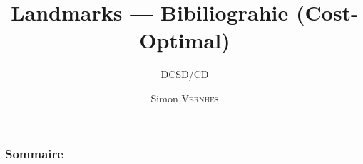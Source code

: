 \documentclass{beamer}
\title{Landmarks — Bibiliograhie (Cost-Optimal)}
\subtitle{\footnotesize DCSD/CD}
\author{{\Large Simon \textsc{Vernhes}}}
\institute{\textsc{{\large Onera}}}
\date{\oldstylenums{\today}}
\begin{document}
	\begin{frame}
		\titlepage
	\end{frame}

	\begin{frame}
		\frametitle{Sommaire}
		\small \tableofcontents
	\end{frame}

  
  
\end{document}
